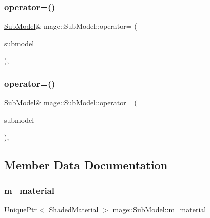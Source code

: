 \subsubsection{\texorpdfstring{operator=()}{operator=()}\hspace{0.1cm}{\footnotesize\ttfamily [1/2]}}
{\footnotesize\ttfamily \hyperlink{classmage_1_1_sub_model}{Sub\+Model}\& mage\+::\+Sub\+Model\+::operator= (\begin{DoxyParamCaption}\item[{const \hyperlink{classmage_1_1_sub_model}{Sub\+Model} \&}]{submodel }\end{DoxyParamCaption})\hspace{0.3cm}{\ttfamily [private]}, {\ttfamily [delete]}}

\hypertarget{classmage_1_1_sub_model_a616b8007e767deebc248485fb8d26773}{}\label{classmage_1_1_sub_model_a616b8007e767deebc248485fb8d26773} 
\subsubsection{\texorpdfstring{operator=()}{operator=()}\hspace{0.1cm}{\footnotesize\ttfamily [2/2]}}
{\footnotesize\ttfamily \hyperlink{classmage_1_1_sub_model}{Sub\+Model}\& mage\+::\+Sub\+Model\+::operator= (\begin{DoxyParamCaption}\item[{\hyperlink{classmage_1_1_sub_model}{Sub\+Model} \&\&}]{submodel }\end{DoxyParamCaption})\hspace{0.3cm}{\ttfamily [private]}, {\ttfamily [delete]}}



\subsection{Member Data Documentation}
\hypertarget{classmage_1_1_sub_model_a162ac42efa17ae49d14ce0fc42c7449c}{}\label{classmage_1_1_sub_model_a162ac42efa17ae49d14ce0fc42c7449c} 
\subsubsection{\texorpdfstring{m\+\_\+material}{m\_material}}
{\footnotesize\ttfamily \hyperlink{namespacemage_a8c307fbcc33bce9b7f2aa4c26c3b95cf}{Unique\+Ptr}$<$ \hyperlink{structmage_1_1_shaded_material}{Shaded\+Material} $>$ mage\+::\+Sub\+Model\+::m\+\_\+material\hspace{0.3cm}{\ttfamily [private]}}

